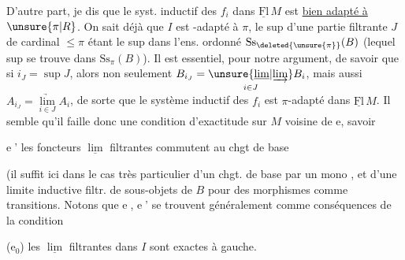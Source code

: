  D'autre part, je dis que le syst. inductif des $f_i$ dans $\underline{\mathrm{Fl}}\,M$ est \uline{bien adapté à} $\unsure{\pi|R}$. On sait déjà que $I$ est  -adapté à $\pi$, le  sup  d'une partie filtrante $J$ de cardinal $\leq\pi$ étant le sup dans l'ens. ordonné $\mathrm{Ss}_{\deleted{\unsure{\pi}}}(B)$ (lequel sup se trouve dans $\mathrm{Ss}_\pi(B)$). Il est essentiel, pour notre argument, de savoir que si $i_J=\sup J$, alors non seulement $B_{i_J}=\underset{i\in J}{\unsure{\underline{\lim}|\underrightarrow{\lim}}} B_i$, mais aussi $A_{i_J}=\underset{i\in J}{\underrightarrow{\lim}} A_i$, de sorte que \margin{$\Vert$}le système inductif des $f_i$ est $\pi$-adapté dans $\underline{\mathrm{Fl}}\,M$. Il semble qu'il faille donc une condition d'exactitude sur $M$ voisine de e, savoir

\textcircled{e'} les foncteurs $\underline{\lim}$ filtrantes commutent au chgt de base  

(il  suffit ici dans le cas très particulier d'un chgt. de base par un mono , et d'une limite inductive filtr. de sous-objets de $B$ pour des morphismes  comme transitions. Notons que \textcircled{e}, \textcircled{e'} se trouvent généralement comme conséquences de la condition

(e$_0$) les $\underline{\lim}$ filtrantes dans $I$ sont exactes à gauche.
